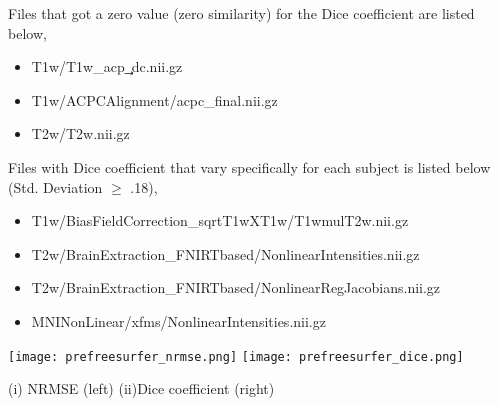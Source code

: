 Files that got a zero value (zero similarity) for the Dice coefficient are listed below,
\begin{itemize}
\item T1w/T1w\_acp\c\_dc.nii.gz
\item T1w/ACPCAlignment/acpc\_final.nii.gz
\item T2w/T2w.nii.gz
\end{itemize}

Files with Dice coefficient that vary specifically for each subject is listed below (Std. Deviation $\geq$ .18),
\begin{itemize}
\item T1w/BiasFieldCorrection\_sqrtT1wXT1w/T1wmulT2w.nii.gz
\item T2w/BrainExtraction\_FNIRTbased/NonlinearIntensities.nii.gz
\item T2w/BrainExtraction\_FNIRTbased/NonlinearRegJacobians.nii.gz
\item MNINonLinear/xfms/NonlinearIntensities.nii.gz
\end{itemize}

\begin{center}
\texttt{[image: prefreesurfer\_nrmse.png]}%
\texttt{[image: prefreesurfer\_dice.png]}
\caption*{(i) NRMSE (left) (ii)Dice coefficient (right)}
\label{fig:prefreesurfer_metric_values}
\end{center}


